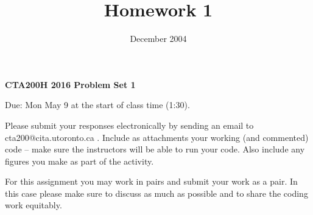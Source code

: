 \documentclass[]{article}
\begin{document}
\title{Homework 1}
\author{}
\date{December 2004}



\textbf{ CTA200H 2016 Problem Set 1}

Due: Mon May 9 at the start of class time (1:30).

Please submit your responses electronically by sending an email to cta200@cita.utoronto.ca .  Include as attachments your working (and commented) code -- make sure the instructors will be able to run your code.  Also include any figures you make as part of the activity.

For this assignment you may work in pairs and submit your work as a pair.  In this case please make sure to discuss as much as possible and to share the coding work equitably.
\end{document}

